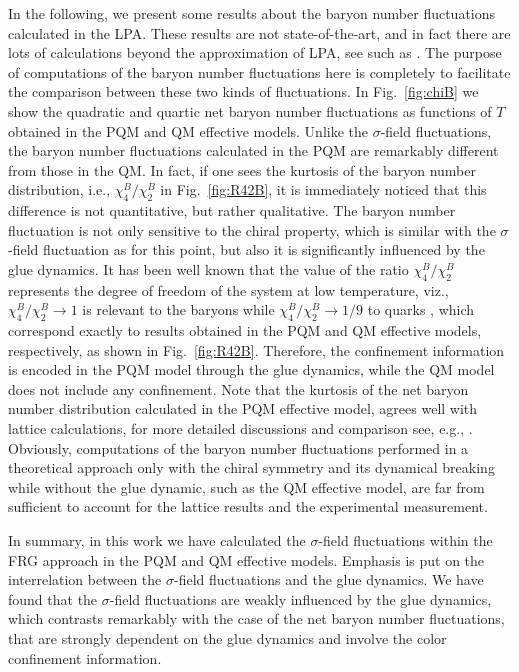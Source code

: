 \documentclass[final,5p,times,twocolumn,colorlinks=true,citecolor=blue,linkcolor=blue]{elsarticle}
\def\Fig#1{Fig.~\ref{#1}} \def\Tab#1{Tab.~\ref{#1}}
\begin{document}
In the following, we present some results about the baryon number fluctuations calculated in the LPA. These results are not state-of-the-art, and in fact there are lots of calculations beyond the approximation of LPA, see such as \cite{Fu:2015naa,Fu:2015amv,Fu:2016tey}. The purpose of computations of the baryon number fluctuations here is completely to facilitate the comparison between these two kinds of fluctuations. In \Fig{fig:chiB} we show the quadratic and quartic net baryon number fluctuations as functions of $T$ obtained in the PQM and QM effective models. Unlike the $\sigma$-field fluctuations, the baryon number fluctuations calculated in the PQM are remarkably different from those in the QM. In fact, if one sees the kurtosis of the baryon number distribution, i.e., $\chi_4^{B}/\chi_2^{B}$ in \Fig{fig:R42B}, it is immediately noticed that this difference is not quantitative, but rather qualitative. The baryon number fluctuation is not only sensitive to the chiral property, which is similar with the $\sigma$-field fluctuation as for this point, but also it is significantly influenced by the glue dynamics. It has been well known that the value of the ratio $\chi_4^{B}/\chi_2^{B}$ represents the degree of freedom of the system at low temperature, viz., $\chi_4^{B}/\chi_2^{B} \rightarrow 1$ is relevant to the baryons while $\chi_4^{B}/\chi_2^{B} \rightarrow 1/9$ to quarks \cite{Fu:2007xc,Fu:2015naa}, which correspond exactly to results obtained in the PQM and QM effective models, respectively, as shown in \Fig{fig:R42B}. Therefore, the confinement information is encoded in the PQM model through the glue dynamics, while the QM model does not include any confinement. Note that the kurtosis of the net baryon number distribution calculated in the PQM effective model, agrees well with lattice calculations, for more detailed discussions and comparison see, e.g., \cite{Fu:2015naa,Fu:2015amv,Fu:2016tey}. Obviously, computations of the baryon number fluctuations performed in a theoretical approach only with the chiral symmetry and its dynamical breaking while without the glue dynamic, such as the QM effective model, are far from sufficient to account for the lattice results and the experimental measurement.

In summary, in this work we have calculated the $\sigma$-field fluctuations within the FRG approach in the PQM and QM effective models. Emphasis is put on the interrelation between the $\sigma$-field fluctuations and the glue dynamics. We have found that the $\sigma$-field fluctuations are weakly influenced by the glue dynamics, which contrasts remarkably  with the case of the net baryon number fluctuations, that are strongly dependent on the glue dynamics and involve the color confinement information.
\end{document}
